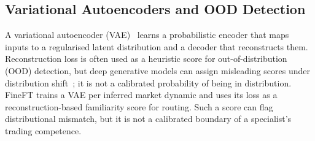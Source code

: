 \subsection{Variational Autoencoders and OOD Detection}
\label{sec:bg_vae}

A variational autoencoder (VAE)~\cite{kingma2013auto} learns a probabilistic encoder that maps inputs to a regularised latent distribution and a decoder that reconstructs them. Reconstruction loss is often used as a heuristic score for out-of-distribution (OOD) detection, but deep generative models can assign misleading scores under distribution shift~\cite{zhang2021understanding}; it is not a calibrated probability of being in distribution. FineFT trains a VAE per inferred market dynamic and uses its loss as a reconstruction-based familiarity score for routing. Such a score can flag distributional mismatch, but it is not a calibrated boundary of a specialist's trading competence.
